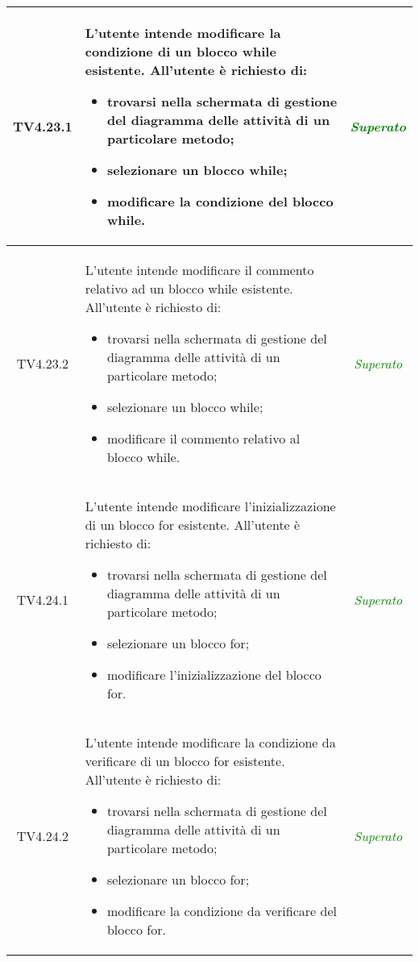 \begin{longtable}{|c|>{}m{8cm}|c|}
\hypertarget{TV4.23.1}{TV4.23.1} & L'utente intende modificare la condizione di un blocco while esistente.
All'utente è richiesto di:
\begin{itemize}
\item trovarsi nella schermata di gestione del diagramma delle attività di un particolare metodo;
\item selezionare un blocco while;
\item modificare la condizione del blocco while.
\end{itemize} & \textcolor{Green}{\textit{Superato}}\\ \hline

\hypertarget{TV4.23.2}{TV4.23.2} & L'utente intende modificare il commento relativo ad un blocco while esistente.
All'utente è richiesto di:
\begin{itemize}
\item trovarsi nella schermata di gestione del diagramma delle attività di un particolare metodo;
\item selezionare un blocco while;
\item modificare il commento relativo al blocco while.
\end{itemize} & \textcolor{Green}{\textit{Superato}}\\ \hline

\hypertarget{TV4.24.1}{TV4.24.1} & L'utente intende modificare l'inizializzazione di un blocco for esistente.
All'utente è richiesto di:
\begin{itemize}
	\item trovarsi nella schermata di gestione del diagramma delle attività di un particolare metodo; 
	\item selezionare un blocco for; 
	\item modificare l'inizializzazione del blocco for. 
\end{itemize} & \textcolor{Green}{\textit{Superato}}\\ \hline

\hypertarget{TV4.24.2}{TV4.24.2} & L'utente intende modificare la condizione da verificare di un blocco for esistente.
All'utente è richiesto di:
\begin{itemize}
	\item trovarsi nella schermata di gestione del diagramma delle attività di un particolare metodo;
	\item selezionare un blocco for;
	\item modificare la condizione da verificare del blocco for.
\end{itemize} & \textcolor{Green}{\textit{Superato}}\\ \hline


\end{longtable}
